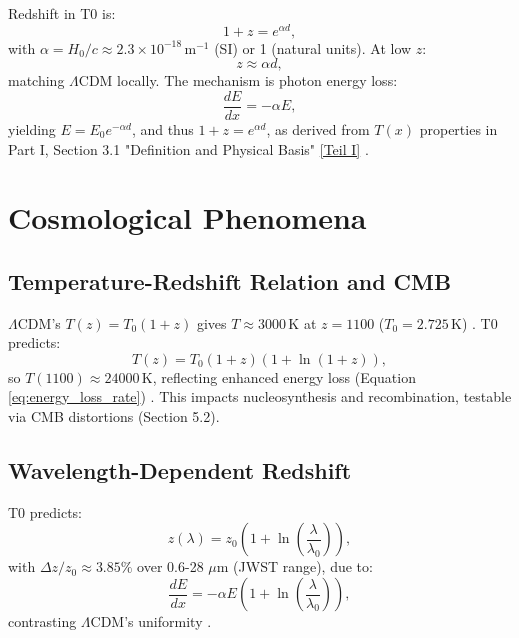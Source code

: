\documentclass[twocolumn,aps,prl]{revtex4-2}
\newcommand{\Tfield}{T(x)}
\newcommand{\LCDM}{\Lambda\text{CDM}}
\begin{document}
	Redshift in T0 is:
	\begin{equation}
		1 + z = e^{\alpha d},
		\label{eq:redshift_distance}
	\end{equation}
	with \(\alpha = H_0 / c \approx 2.3 \times 10^{-18} \, \text{m}^{-1}\) (SI) or 1 (natural units). At low \(z\):
	\begin{equation}
		z \approx \alpha d,
		\label{eq:hubble_approx}
	\end{equation}
	matching \(\LCDM\) locally. The mechanism is photon energy loss:
	\begin{equation}
		\frac{dE}{dx} = -\alpha E,
		\label{eq:energy_loss_rate}
	\end{equation}
	yielding \(E = E_0 e^{-\alpha d}\), and thus \(1 + z = e^{\alpha d}\), as derived from \(\Tfield\) properties in Part I, Section 3.1 "Definition and Physical Basis" \href{https://github.com/jpascher/T0-Time-Mass-Duality/tree/main/2/pdf/English/Bridging Quantum Mechanics and Relativity through Time-Mass Duality Part I Theoretical Foundations_en.pdf}{[Teil I]} \cite{pascher_messdifferenzen_2025}.
	
	\section{Cosmological Phenomena}
	\label{sec:cosmological_phenomena}
	
	\subsection{Temperature-Redshift Relation and CMB}
	\label{subsec:cmb_temp}
	
	\(\LCDM\)’s \(T(z) = T_0 (1 + z)\) gives \(T \approx 3000 \, \text{K}\) at \(z = 1100\) (\(T_0 = 2.725 \, \text{K}\)) \cite{Fixsen2009}. T0 predicts:
	\begin{equation}
		T(z) = T_0 (1 + z) (1 + \ln(1 + z)),
		\label{eq:temperature_redshift_simplified}
	\end{equation}
	so \(T(1100) \approx 24000 \, \text{K}\), reflecting enhanced energy loss (Equation \ref{eq:energy_loss_rate}) \cite{pascher_temp_2025}. This impacts nucleosynthesis and recombination, testable via CMB distortions (Section 5.2).
	
	\subsection{Wavelength-Dependent Redshift}
	\label{subsec:wavelength_redshift}
	
	T0 predicts:
	\begin{equation}
		z(\lambda) = z_0 \left(1 + \ln\left(\frac{\lambda}{\lambda_0}\right)\right),
		\label{eq:wavelength_redshift}
	\end{equation}
	with \(\Delta z / z_0 \approx 3.85\%\) over 0.6-28 \(\mu\text{m}\) (JWST range), due to:
	\begin{equation}
		\frac{dE}{dx} = -\alpha E \left(1 + \ln\left(\frac{\lambda}{\lambda_0}\right)\right),
		\label{eq:wavelength_energy_loss}
	\end{equation}
	contrasting \(\LCDM\)’s uniformity \cite{pascher_params_2025}.
	
\end{document}
